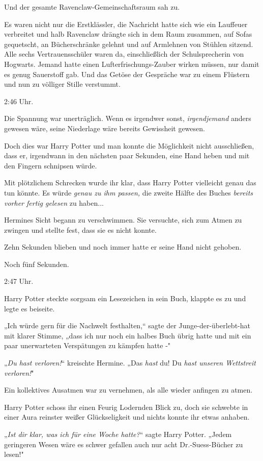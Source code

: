 {Und der gesamte Ravenclaw-Gemeinschaftsraum sah zu.

Es waren nicht nur die Erstklässler, die Nachricht hatte sich wie ein Lauffeuer verbreitet und halb Ravenclaw drängte sich in dem Raum zusammen, auf Sofas gequetscht, an Bücherschränke gelehnt und auf Armlehnen von Stühlen sitzend. Alle sechs Vertrauensschüler waren da, einschließlich der Schulsprecherin von Hogwarts. Jemand hatte einen Lufterfrischungs-Zauber wirken müssen, nur damit es genug Sauerstoff gab. Und das Getöse der Gespräche war zu einem Flüstern und nun zu völliger Stille verstummt.

2:46 Uhr.

Die Spannung war unerträglich. Wenn es irgendwer sonst, \emph{irgendjemand} anders gewesen wäre, seine Niederlage wäre bereits Gewissheit gewesen.

Doch dies war Harry Potter und man konnte die Möglichkeit nicht ausschließen, dass er, irgendwann in den nächsten paar Sekunden, eine Hand heben und mit den Fingern schnipsen würde.

Mit plötzlichem Schrecken wurde ihr klar, dass Harry Potter vielleicht genau das tun könnte. Es würde \emph{genau zu ihm passen,} die zweite Hälfte des Buches \emph{bereits vorher fertig gelesen} zu haben...

Hermines Sicht begann zu verschwimmen. Sie versuchte, sich zum Atmen zu zwingen und stellte fest, dass sie es nicht konnte.

Zehn Sekunden blieben und noch immer hatte er seine Hand nicht gehoben.

Noch fünf Sekunden.

2:47 Uhr.

Harry Potter steckte sorgsam ein Lesezeichen in sein Buch, klappte es zu und legte es beiseite.

„Ich würde gern für die Nachwelt festhalten,“ sagte der Junge-der-überlebt-hat mit klarer Stimme, „dass ich nur noch ein halbes Buch übrig hatte und mit ein paar unerwarteten Verspätungen zu kämpfen hatte -"

„\emph{Du hast verloren!}“ kreischte Hermine. „Das \emph{hast} du! Du \emph{hast unseren Wettstreit verloren!}"

Ein kollektives Ausatmen war zu vernehmen, als alle wieder anfingen zu atmen.

Harry Potter schoss ihr einen Feurig Lodernden Blick zu, doch sie schwebte in einer Aura reinster weißer Glückseligkeit und nichts konnte ihr etwas anhaben.

„\emph{Ist dir klar, was ich für eine Woche hatte?}“ sagte Harry Potter. „Jedem geringeren Wesen wäre es schwer gefallen auch nur acht Dr.-Suess-Bücher zu lesen!"

}
